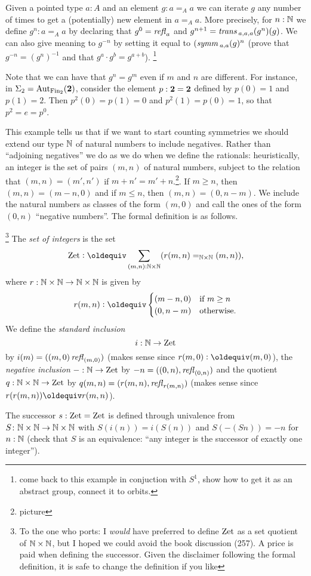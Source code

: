  \begin{example}\label{ex:orbitofanelement}
   Given a pointed type $a:A$ and an element $g: a=_Aa$ we can iterate $g$ any number of times to get a (potentially) new element in $a=_Aa$. More precisely, for $n:\mathbb{N}$ we define $g^n:a=_Aa$ by declaring that $g^0=\mathop{{\it refl}_{a}}$ and $g^{n+1}=\mathop{\mathit{trans}}{}_{a,a,a}(g^n)(g)$.  We can also give meaning to $g^{-n}$ by setting it equal to $(\mathop{\mathit{symm}}{}_{a,a}(g)^n$ (prove that $g^{-n}=(g^n)^{-1}$ and that $g^a\cdot g^b=g^{a+b}$).  \footnote{come back to this example in conjuction with $S^1$, show how to get it as an abstract group, connect it to orbits.}

Note that we can have that $g^n=g^m$ even if $m$ and $n$ are different.  For instance, in $\Sigma_2=\mathrm{Aut}_{\operatorname{Fin}_2}(\mathbf{2} )$, consider the element $p:\mathbf{2} =\mathbf{2} $ defined by $p(0)=1$ and $p(1)=2$.  Then $p^2(0)=p(1)=0$ and $p^2(1)=p(0)=1$, so that $p^2=e=p^0$.
   \end{example}
This example tells us that if we want to start counting symmetries we should extend our type $\mathbb{N}$ of natural numbers to include negatives.  Rather than ``adjoining negatives'' we do as we do when we define the rationals: heuristically, an integer is the set of pairs $(m,n)$ of natural numbers, subject to the relation that $(m,n)=(m',n')$ if $m+n'=m'+n$.\footnote{picture}.  If $m\geq n$, then $(m,n)=(m-n,0)$ and if $m\leq n$, then $(m,n)=(0,n-m)$.  We include the natural numbers as classes of the form $(m,0)$ and call the ones of the form $(0,n)$ ``negative numbers''.  The formal definition is as follows.
\begin{definition}
  \label{def:zet}\footnote{To the one who ports: I \emph{would} have preferred to define $\mathrm{Zet}$ as a set quotient of $\mathbb{N}\times\mathbb{N}$, but I hoped we could avoid the book discussion (257).  A price is paid when defining the successor.  Given the disclaimer following the formal definition, it is safe to change the definition if you like}
  The \emph{set of integers} is the set
$$\zet\defequi \sum_{(m,n):\NN\times\NN}(r(m,n)=_{\NN\times\NN}(m,n)),$$
where $r:\mathbb{N}\times\mathbb{N}\to\mathbb{N}\times\mathbb{N}$ is given by
$$r(m,n)\defequi
\begin{cases}
  (m-n,0)&\text{if $m\geq n$}\\
  (0,n-m)&\text{otherwise.}
\end{cases}
$$
We define the \emph{standard inclusion} 
$$i:\mathbb{N}\to\mathrm{Zet}$$ by $i(m)=((m,0)\mathop{{\it refl}_{(m,0)}})$ (makes sense since $r(m,0)\defequi(m,0)$), the \emph{negative inclusion} $-:\mathbb{N}\to\mathrm{Zet}$ by $-n=((0,n),\mathop{{\it refl}_{(0,n)}})$ and the quotient $q:\mathbb{N}\times\mathbb{N}\to\mathrm{Zet}$ by $q(m,n)=(r(m,n),\mathop{{\it refl}_{r(m,n)}})$ (makes sense since $r(r(m,n))\oldequiv r(m,n)$).  

The successor $s:\mathrm{Zet}=\mathrm{Zet}$ is defined through univalence from $S\colon\mathbb{N}\times\mathbb{N}\to\mathbb{N}\times\mathbb{N}$ with $S(i(n))=i(S(n))$  and $S(-(Sn))=-n$ for $n:\mathbb{N}$ (check that $S$ is an equivalence: ``any integer is the successor of exactly one integer'').
\end{definition}


